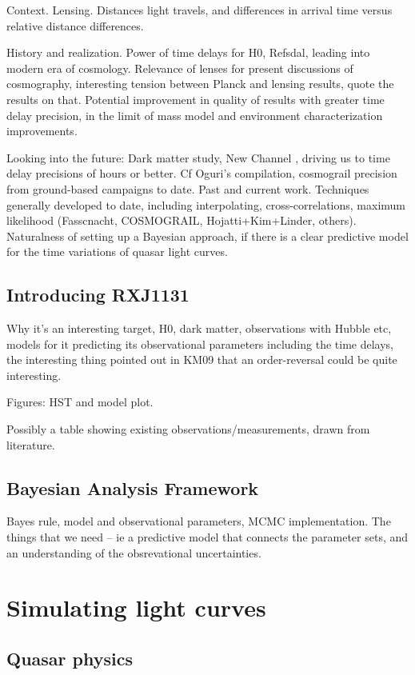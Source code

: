 \documentclass{emulateapj}
\begin{document}
Context. Lensing. Distances light travels, and differences in arrival
time versus relative distance differences.

History and realization. Power of time delays for H0, Refsdal, leading into modern
era of cosmology.  Relevance of lenses for present discussions of
cosmography, interesting tension between Planck and lensing results,
quote the results on that.  Potential improvement in quality of
results with greater time delay precision, in the limit of mass model
and environment characterization improvements. 

Looking into the future: Dark matter study, New Channel \citep{Keeton2009a}, driving us to
time delay precisions of hours or better.  Cf Oguri's compilation,
cosmograil precision from ground-based campaigns to date. Past and current work. 
Techniques generally developed to date, including interpolating, cross-correlations, maximum likelihood (Fasscnacht, COSMOGRAIL, Hojatti+Kim+Linder, others). Naturalness of setting up a Bayesian approach, if there is a clear predictive model for the time variations of quasar light curves. 

\subsection{Introducing RXJ1131}

Why it's an interesting target, H0, dark matter, observations with Hubble etc, models for it predicting its observational parameters including the time delays, the interesting thing pointed out in KM09 that an order-reversal could be quite interesting. 

Figures: HST and model plot. 

Possibly a table showing existing observations/measurements, drawn from literature. 

\subsection{Bayesian Analysis Framework}

Bayes rule, model and observational parameters, MCMC implementation. The things that we need -- ie a predictive model that connects the parameter sets, and an understanding of the obsrevational uncertainties.

\section{Simulating light curves}
\subsection{Quasar physics}
\end{document}
